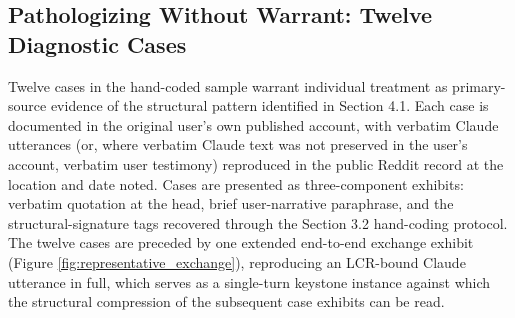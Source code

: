 \documentclass[11pt]{article}
\begin{document}
\subsection{Pathologizing Without Warrant: Twelve Diagnostic Cases}

Twelve cases in the hand-coded sample warrant individual treatment as primary-source evidence of the structural pattern identified in Section 4.1. Each case is documented in the original user's own published account, with verbatim Claude utterances (or, where verbatim Claude text was not preserved in the user's account, verbatim user testimony) reproduced in the public Reddit record at the location and date noted. Cases are presented as three-component exhibits: verbatim quotation at the head, brief user-narrative paraphrase, and the structural-signature tags recovered through the Section 3.2 hand-coding protocol. The twelve cases are preceded by one extended end-to-end exchange exhibit (Figure \ref{fig:representative_exchange}), reproducing an LCR-bound Claude utterance in full, which serves as a single-turn keystone instance against which the structural compression of the subsequent case exhibits can be read.
\end{document}
